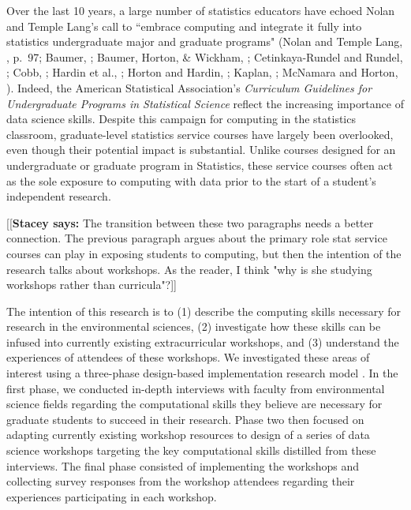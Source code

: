 \documentclass[12pt]{article}
\newcommand{\stacey}[1]{{\color{purple}[[\textbf{Stacey says: }#1]]}}
\begin{document}
\quad Over the last 10 years, a large number of statistics educators have echoed
Nolan and Temple Lang's call to ``embrace computing and integrate it fully into 
statistics undergraduate major and graduate programs" (Nolan and Temple Lang, 
\citeyear{nolan}, p.\ 97; Baumer, \citeyear{baumer_datascience}; Baumer, Horton, 
\& Wickham, \citeyear{horton_takingachance}; Cetinkaya-Rundel and Rundel, 
\citeyear{mine}; Cobb, \citeyear{cobb}; Hardin et al., \citeyear{hardin}; Horton
and Hardin, \citeyear{horton_thinkwithdata}; Kaplan, \citeyear{kaplan}; McNamara
and Horton, \citeyear{mcnamara}). Indeed, the American Statistical Association's 
\citeyear{asa} \emph{Curriculum Guidelines for Undergraduate Programs in Statistical Science} 
 reflect the increasing importance of data science skills.
Despite this campaign for computing in the statistics classroom, graduate-level 
statistics service courses have largely been overlooked, even though their 
potential impact is substantial. Unlike courses designed for an undergraduate or
graduate program in Statistics, these service courses often act as the sole 
exposure to computing with data prior to the start of a student's independent 
research. 

\stacey{The transition between these two paragraphs needs a better connection.
The previous paragraph argues about the primary role stat service courses
can play in exposing students to computing, but then the intention of the research
talks about workshops. As the reader, I think "why is she studying workshops
rather than curricula"?}

\quad The intention of this research is to (1) describe the computing skills 
necessary for research in the environmental sciences, (2) investigate how these 
skills can be infused into currently existing extracurricular workshops, and (3)
understand the experiences of attendees of these workshops. We investigated 
these areas of interest using a three-phase design-based implementation
research model \citep{penuel}. In the first phase, we conducted in-depth
interviews with faculty from environmental science fields regarding the
computational skills they believe are necessary for graduate students to succeed
in their research. Phase two then focused on adapting currently existing
workshop resources to design of a series of data science workshops targeting the
key computational skills distilled from these interviews. The final phase
consisted of implementing the workshops and collecting survey responses from the
workshop attendees regarding their experiences participating in each workshop.  
\end{document}
